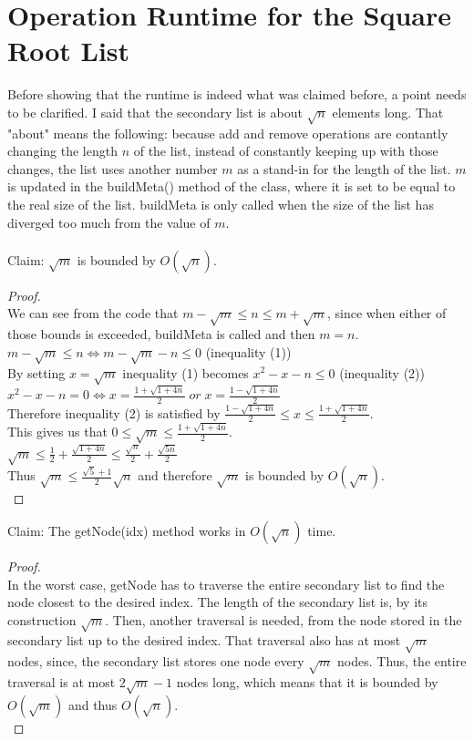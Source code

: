 \documentclass[10pt]{article}
\begin{document}
\section{Operation Runtime for the Square Root List}
Before showing that the runtime is indeed what was claimed before, a point needs to be clarified. I said that the secondary list is about $\sqrt{n}$ elements long. That "about" means the following: because add and remove operations are contantly changing the length $n$ of the list, instead of constantly keeping up with those changes, the list uses another number $m$ as a stand-in for the length of the list. $m$ is updated in the buildMeta() method of the class, where it is set to be equal to the real size of the list. buildMeta is only called when the size of the list has diverged too much from the value of $m$.\\\\
Claim: $\sqrt{m}$ is bounded by $O(\sqrt{n})$.
\begin{proof}
	$ $\\
	We can see from the code that $m - \sqrt{m} \leq n \leq m + \sqrt{m}$, since when either of those bounds is exceeded, buildMeta is called and then $m = n$.\\
	$m - \sqrt{m} \leq n \iff m - \sqrt{m} - n \leq 0$ (inequality (1))\\
	By setting $x = \sqrt{m}$ inequality (1) becomes $x^2 - x - n \leq 0$ (inequality (2))\\
	$x^2 - x - n = 0 \iff x = \frac{1 + \sqrt{1 + 4n}}{2} \; or \; x = \frac{1 - \sqrt{1 + 4n}}{2}$\\
	Therefore inequality (2) is satisfied by $\frac{1 - \sqrt{1 + 4n}}{2} \leq x \leq \frac{1 + \sqrt{1 + 4n}}{2}$.\\
	This gives us that $0 \leq \sqrt{m} \leq \frac{1 + \sqrt{1 + 4n}}{2}$.\\
	$\sqrt{m} \leq \frac{1}{2} + \frac{\sqrt{1 + 4n}}{2} \leq \frac{\sqrt{n}}{2} + \frac{\sqrt{5n}}{2}$\\
	Thus $\sqrt{m} \leq \frac{\sqrt{5} + 1}{2}\sqrt{n}$ and therefore $\sqrt{m}$ is bounded by $O(\sqrt{n})$.\\

\end{proof}

Claim: The getNode(idx) method works in $O(\sqrt{n})$ time.
\begin{proof}
	$ $\\
	In the worst case, getNode has to traverse the entire secondary list to find the node closest to the desired index. The length of the secondary list is, by its construction $\sqrt{m}$. Then, another traversal is needed, from the node stored in the secondary list up to the desired index. That traversal also has at most $\sqrt{m}$ nodes, since, the secondary list stores one node every $\sqrt{m}$ nodes. Thus, the entire traversal is at most $2\sqrt{m} - 1$ nodes long, which means that it is bounded by $O(\sqrt{m})$ and thus $O(\sqrt{n})$.\\
\end{proof}
\end{document}
